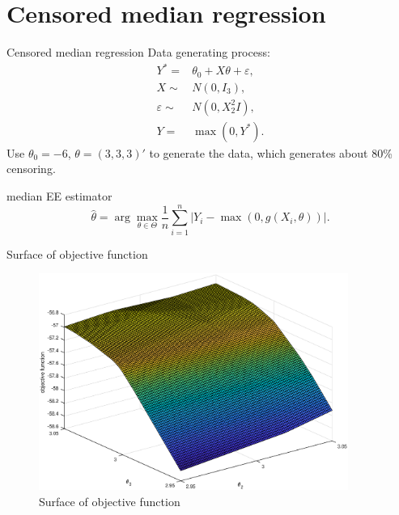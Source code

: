 \documentclass{beamer}
\begin{document}
\section{Censored median regression}

\begin{frame}{Censored median regression}
    Data generating process:
    \begin{align*}
        Y^{*} = & \theta_0 + X\theta + \varepsilon, \\ 
      X  \sim &N(0,I_3), \\
      \varepsilon  \sim & N(0,X_2^2I), \\
      Y  = & \max(0,Y^{*}).
    \end{align*}
    Use $\theta_0 = -6$, $\theta = (3,3,3)'$ to generate the data, which generates about 80\% censoring.
    \begin{block}{median EE estimator}
        \begin{equation*}
            \hat{\theta} =  \arg\max_{\theta\in\Theta}\frac{1}{n}\sum\limits_{i=1}^n|Y_i-\max(0,g(X_i,\theta))|.
        \end{equation*}
    \end{block}
\end{frame}

\begin{frame}{Surface of objective function}
\begin{figure}[hp]
    \centering
    \includegraphics[width=0.9\textwidth]{figures/mesh.eps}
    \caption{Surface of objective function}
    \label{fig:lte-mean}
\end{figure}
\end{frame}
\end{document}
